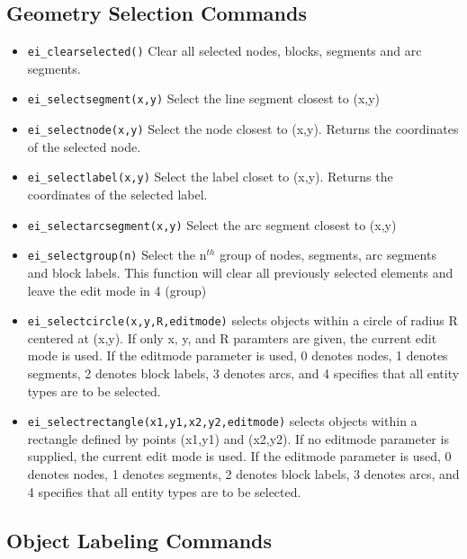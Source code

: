 \subsection{Geometry Selection Commands}

\begin{itemize}
\item {\tt ei\_clearselected()} Clear all selected nodes, blocks, segments and arc
segments.

\item {\tt ei\_selectsegment(x,y)} Select the line segment closest to (x,y)

\item {\tt ei\_selectnode(x,y)} Select the node closest to (x,y).
Returns the coordinates of the selected node.

\item {\tt ei\_selectlabel(x,y)} Select the label closet to (x,y).
Returns the coordinates of the selected label.

\item {\tt ei\_selectarcsegment(x,y)} Select the arc segment closest to (x,y)

\item {\tt ei\_selectgroup(n)} Select the n$^{th}$ group of nodes, segments, arc
segments and block labels. This function will clear all previously selected
elements and leave the edit mode in 4 (group)

\item{\tt ei\_selectcircle(x,y,R,editmode)} selects objects within a circle of radius
R centered at (x,y).  If only x, y, and R paramters are given, the current
edit mode is used.  If the editmode parameter is used, 0 denotes nodes, 1 denotes segments,
2 denotes block labels, 3 denotes arcs, and 4 specifies that all entity types are to be selected.

\item{\tt ei\_selectrectangle(x1,y1,x2,y2,editmode)} selects objects within a rectangle
defined by points (x1,y1) and (x2,y2). If no editmode parameter is supplied,
the current edit mode is used.  If the editmode parameter is used, 0 denotes nodes, 1 denotes segments,
2 denotes block labels, 3 denotes arcs, and 4 specifies that all entity types are to be selected.
\end{itemize}


\subsection{Object Labeling Commands}

